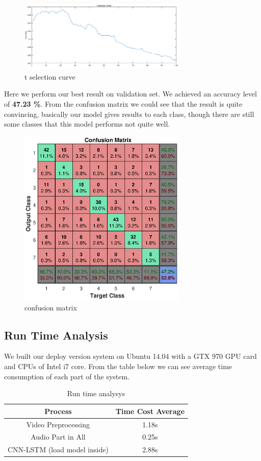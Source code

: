 \documentclass[10pt,twocolumn,letterpaper]{article}
\begin{document}
\begin{figure}[htpb]
	\centering
	\includegraphics[width = 8cm]{pic/t_selection.eps}
	\caption{t selection curve}
\end{figure}

Here we perform our best result on validation set. We achieved an accuracy level of \textbf{47.23 \%}. From the confusion matrix we could see that the result is quite convincing, basically our model gives results to each class, though there are still some classes that this model performs not quite well.

\begin{figure}[htpb]
	\centering
	\includegraphics[width = 8cm]{pic/res_confusion.eps}
	\caption{confusion matrix}
\end{figure}

\subsection{Run Time Analysis}

We built our deploy version system on Ubuntu 14.04 with a GTX 970 GPU card and CPUs of Intel i7 core. From the table below we can see average time consumption of each part of the system.

\begin{table}[htpb]
	\begin{center}
		\begin{tabular}{|c|c|}
			\hline
			\textbf{Process} & \textbf{Time Cost Average} \\
			\hline\hline
			Video Preprocessing & 1.18s\\
			Audio Part in All &  0.25s \\
			CNN-LSTM (load model inside) &  2.88s \\
			
			
			\hline
		\end{tabular}
	\end{center}
	\caption{Run time analysys}
	\label{runtime}
	
\end{table}
\end{document}
